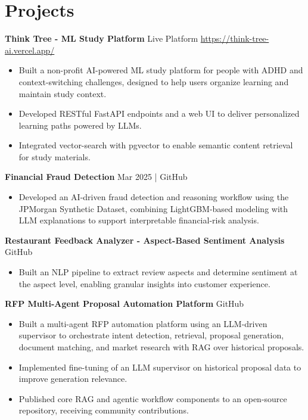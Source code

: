 \documentclass[10pt,a4paper]{article}
\begin{document}
\section{Projects}
\textbf{Think Tree - ML Study Platform} \textbar{} Live Platform \textbar{} \href{https://think-tree-ai.vercel.app/}{https://think-tree-ai.vercel.app/}\par
\begin{itemize}
  \item Built a non-profit AI-powered ML study platform for people with ADHD and context-switching challenges, designed to help users organize learning and maintain study context.
  \item Developed RESTful FastAPI endpoints and a web UI to deliver personalized learning paths powered by LLMs.
  \item Integrated vector-search with pgvector to enable semantic content retrieval for study materials.
\end{itemize}
\textbf{Financial Fraud Detection} \textbar{} Mar 2025 | GitHub\par
\begin{itemize}
  \item Developed an AI-driven fraud detection and reasoning workflow using the JPMorgan Synthetic Dataset, combining LightGBM-based modeling with LLM explanations to support interpretable financial-risk analysis.
\end{itemize}
\textbf{Restaurant Feedback Analyzer - Aspect-Based Sentiment Analysis} \textbar{} GitHub\par
\begin{itemize}
  \item Built an NLP pipeline to extract review aspects and determine sentiment at the aspect level, enabling granular insights into customer experience.
\end{itemize}
\textbf{RFP Multi-Agent Proposal Automation Platform} \textbar{} GitHub\par
\begin{itemize}
  \item Built a multi-agent RFP automation platform using an LLM-driven supervisor to orchestrate intent detection, retrieval, proposal generation, document matching, and market research with RAG over historical proposals.
  \item Implemented fine-tuning of an LLM supervisor on historical proposal data to improve generation relevance.
  \item Published core RAG and agentic workflow components to an open-source repository, receiving community contributions.
\end{itemize}
\end{document}
